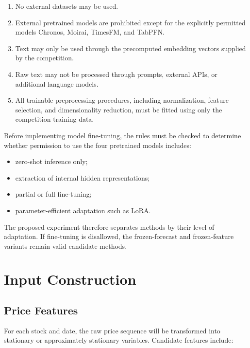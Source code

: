 \documentclass[11pt]{article}
\begin{document}
\begin{enumerate}[label=(\arabic*)]
    \item No external datasets may be used.
    \item External pretrained models are prohibited except for the explicitly
    permitted models Chronos, Moirai, TimesFM, and TabPFN.
    \item Text may only be used through the precomputed embedding vectors
    supplied by the competition.
    \item Raw text may not be processed through prompts, external APIs, or
    additional language models.
    \item All trainable preprocessing procedures, including normalization,
    feature selection, and dimensionality reduction, must be fitted using only
    the competition training data.
\end{enumerate}

Before implementing model fine-tuning, the rules must be checked to determine
whether permission to use the four pretrained models includes:

\begin{itemize}
    \item zero-shot inference only;
    \item extraction of internal hidden representations;
    \item partial or full fine-tuning;
    \item parameter-efficient adaptation such as LoRA.
\end{itemize}

The proposed experiment therefore separates methods by their level of
adaptation. If fine-tuning is disallowed, the frozen-forecast and frozen-feature
variants remain valid candidate methods.

\section{Input Construction}

\subsection{Price Features}

For each stock and date, the raw price sequence will be transformed into
stationary or approximately stationary variables. Candidate features include:
\end{document}
